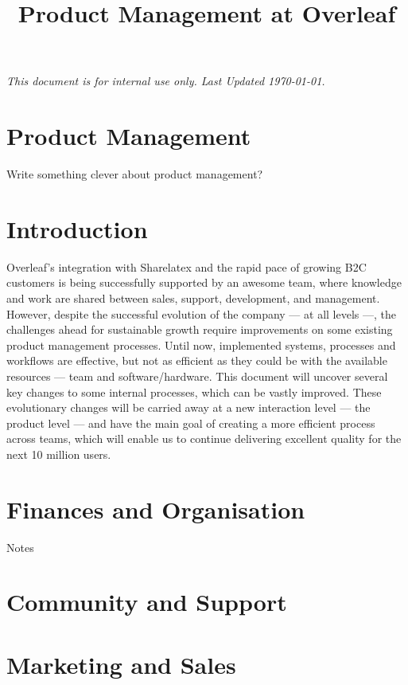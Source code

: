 \documentclass[11pt,a4paper,parskip=half]{scrartcl}
\title{Product Management at Overleaf}
\begin{document}
\maketitle
\vspace{-1em}
\textit{This document is for internal use only. Last Updated \today.}

\section*{Product Management} 

Write something clever about product management?

\tableofcontents
\newpage 

\section{Introduction}
Overleaf’s integration with Sharelatex and the rapid pace of growing B2C customers is being successfully supported by an awesome team, where knowledge and work are shared between sales, support, development, and management.
However, despite the successful evolution of the company — at all levels —, the challenges ahead for sustainable growth require improvements on some existing product management processes. Until now, implemented systems, processes and workflows are effective, but not as efficient as they could be with the available resources — team and software/hardware.
This document will uncover several key changes to some internal processes, which can be vastly improved. These evolutionary changes will be carried away at a new interaction level — the product level — and have the main goal of creating a more efficient process across teams, which will enable us to continue delivering excellent quality for the next 10 million users.

\section{Finances and Organisation}
Notes

\section{Community and Support}

\section{Marketing and Sales}
\end{document}
